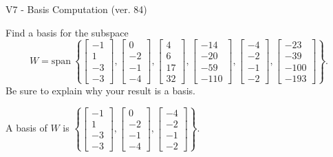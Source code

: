 \begin{exercise}
  \begin{exerciseTitle}V7 - Basis Computation (ver. 84)\end{exerciseTitle}
  \begin{exerciseStatement}
    Find a basis for the subspace 
\[W=\mathrm{span}\ \left\{\left[\begin{array}{r}
-1 \\
1 \\
-3 \\
-3
\end{array}\right] , \left[\begin{array}{r}
0 \\
-2 \\
-1 \\
-4
\end{array}\right] , \left[\begin{array}{r}
4 \\
6 \\
17 \\
32
\end{array}\right] , \left[\begin{array}{r}
-14 \\
-20 \\
-59 \\
-110
\end{array}\right] , \left[\begin{array}{r}
-4 \\
-2 \\
-1 \\
-2
\end{array}\right] , \left[\begin{array}{r}
-23 \\
-39 \\
-100 \\
-193
\end{array}\right]\right\}.\]
 Be sure to explain why your result is a basis.


  \end{exerciseStatement}
  \begin{exerciseAnswer}
   A basis of \(W\) is  \(\left\{\left[\begin{array}{r}
-1 \\
1 \\
-3 \\
-3
\end{array}\right] , \left[\begin{array}{r}
0 \\
-2 \\
-1 \\
-4
\end{array}\right] , \left[\begin{array}{r}
-4 \\
-2 \\
-1 \\
-2
\end{array}\right]\right\}\).
  


  \end{exerciseAnswer}
\end{exercise}